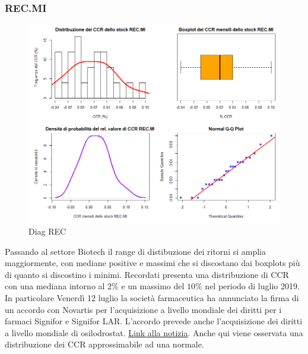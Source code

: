 \documentclass[12pt]{article}
\begin{document}
\subsubsection{REC.MI}
\begin{figure}[!htb]
    \centering
    \includegraphics[width=1\textwidth]{immagini/diag_rec.png}
    \caption{Diag REC}
\end{figure}
\FloatBarrier
Passando al settore Biotech il range di distibuzione dei ritorni si amplia maggiormente, con mediane positive e massimi che si discostano dai boxplots più di quanto si discostino i minimi. Recordati presenta una distribuzione di CCR con una mediana intorno al $2\%$ e un massimo del $10\%$ nel periodo di luglio 2019. In particolare Venerdì 12 luglio la società farmaceutica ha annunciato la firma di un accordo con Novartis per l’acquisizione a livello mondiale dei diritti per i farmaci Signifor e Signifor LAR. L’accordo prevede anche l’acquisizione dei diritti a livello mondiale di osilodrostat. \href{https://www.soldionline.it/notizie/azioni-italia/performance-recordati-15-luglio-2019}{Link alla notizia}. Anche qui viene osservata una distribuzione dei CCR approssimabile ad una normale.
\newpage
\end{document}
